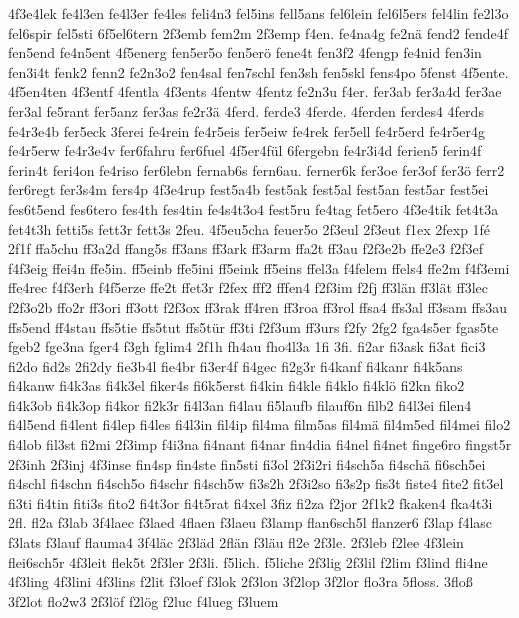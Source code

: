 {4f3e4lek
fe4l3en
fe4l3er
fe4les
feli4n3
fel5ins
fell5ans
fel6lein
fel6l5ers
fel4lin
fe2l3o
fel6spir
fel5sti
6f5el6tern
2f3emb
fem2m
2f3emp
f4en.
fe4na4g
fe2nä
fend2
fende4f
fen5end
fe4n5ent
4f5energ
fen5er5o
fen5erö
fene4t
fen3f2
4fengp
fe4nid
fen3in
fen3i4t
fenk2
fenn2
fe2n3o2
fen4sal
fen7schl
fen3sh
fen5skl
fens4po
5fenst
4f5ente.
4f5en4ten
4f3entf
4fentla
4f3ents
4fentw
4fentz
fe2n3u
f4er.
fer3ab
fer3a4d
fer3ae
fer3al
fe5rant
fer5anz
fer3as
fe2r3ä
4ferd.
ferde3
4ferde.
4ferden
ferdes4
4ferds
fe4r3e4b
fer5eck
3ferei
fe4rein
fe4r5eis
fer5eiw
fe4rek
fer5ell
fe4r5erd
fe4r5er4g
fe4r5erw
fe4r3e4v
fer6fahru
fer6fuel
4f5er4fül
6fergebn
fe4r3i4d
ferien5
ferin4f
ferin4t
feri4on
fe4riso
fer6lebn
fernab6s
fern6au.
ferner6k
fer3oe
fer3of
fer3ö
ferr2
fer6regt
fer3s4m
fers4p
4f3e4rup
fest5a4b
fest5ak
fest5al
fest5an
fest5ar
fest5ei
fes6t5end
fes6tero
fes4th
fes4tin
fe4s4t3o4
fest5ru
fe4tag
fet5ero
4f3e4tik
fet4t3a
fet4t3h
fetti5s
fett3r
fett3s
2feu.
4f5eu5cha
feuer5o
2f3eul
2f3eut
f1ex
2fexp
1fé
2f1f
ffa5chu
ff3a2d
ffang5s
ff3ans
ff3ark
ff3arm
ffa2t
ff3au
f2f3e2b
ffe2e3
f2f3ef
f4f3eig
ffei4n
ffe5in.
ff5einb
ffe5ini
ff5eink
ff5eins
ffel3a
f4felem
ffels4
ffe2m
f4f3emi
ffe4rec
f4f3erh
f4f5erze
ffe2t
ffet3r
f2fex
fff2
fffen4
f2f3im
f2fj
ff3län
ff3lät
ff3lec
f2f3o2b
ffo2r
ff3ori
ff3ott
f2f3ox
ff3rak
ff4ren
ff3roa
ff3rol
ffsa4
ffs3al
ff3sam
ffs3au
ffs5end
ff4stau
ffs5tie
ffs5tut
ffs5tür
ff3ti
f2f3um
ff3urs
f2fy
2fg2
fga4s5er
fgas5te
fgeb2
fge3na
fger4
f3gh
fglim4
2f1h
fh4au
fho4l3a
1fi
3fi.
fi2ar
fi3ask
fi3at
fici3
fi2do
fid2s
2fi2dy
fie3b4l
fie4br
fi3er4f
fi4gec
fi2g3r
fi4kanf
fi4kanr
fi4k5ans
fi4kanw
fi4k3as
fi4k3el
fiker4s
fi6k5erst
fi4kin
fi4kle
fi4klo
fi4klö
fi2kn
fiko2
fi4k3ob
fi4k3op
fi4kor
fi2k3r
fi4l3an
fi4lau
fi5laufb
filauf6n
filb2
fi4l3ei
filen4
fi4l5end
fi4lent
fi4lep
fi4les
fi4l3in
fil4ip
fil4ma
film5as
fil4mä
fil4m5ed
fil4mei
filo2
fi4lob
fil3st
fi2mi
2f3imp
f4i3na
fi4nant
fi4nar
fin4dia
fi4nel
fi4net
finge6ro
fingst5r
2f3inh
2f3inj
4f3inse
fin4sp
fin4ste
fin5sti
fi3ol
2f3i2ri
fi4sch5a
fi4schä
fi6sch5ei
fi4schl
fi4schn
fi4sch5o
fi4schr
fi4sch5w
fi3s2h
2f3i2so
fi3s2p
fis3t
fiste4
fite2
fit3el
fi3ti
fi4tin
fiti3s
fito2
fi4t3or
fi4t5rat
fi4xel
3fiz
fi2za
f2jor
2f1k2
fkaken4
fka4t3i
2fl.
fl2a
f3lab
3f4laec
f3laed
4flaen
f3laeu
f3lamp
flan6sch5l
flanzer6
f3lap
f4lasc
f3lats
f3lauf
flauma4
3f4läc
2f3läd
2flän
f3läu
fl2e
2f3le.
2f3leb
f2lee
4f3lein
flei6sch5r
4f3leit
flek5t
2f3ler
2f3li.
f5lich.
f5liche
2f3lig
2f3lil
f2lim
f3lind
fli4ne
4f3ling
4f3lini
4f3lins
f2lit
f3loef
f3lok
2f3lon
3f2lop
3f2lor
flo3ra
5floss.
3floß
3f2lot
flo2w3
2f3löf
f2lög
f2luc
f4lueg
f3luem
}
